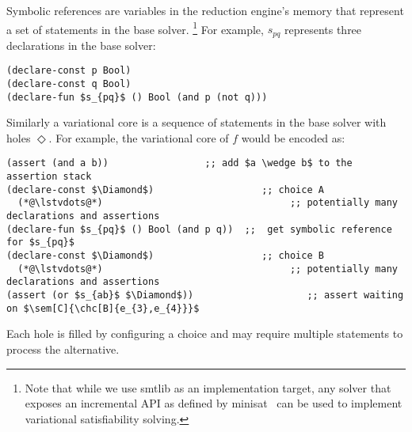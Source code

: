 Symbolic references are variables in the reduction engine's memory that
represent a set of statements in the base solver.%
%
\footnote{Note that while we use \acl{smtlib} as an implementation target, any
  solver that exposes an incremental API as defined by
  minisat~\cite{10.1007/978-3-319-09284-3_16} can be used to implement
  variational satisfiability solving.}
%
For example, $s_{pq}$ represents three declarations in the base solver:
%
\begin{lstlisting}[columns=flexible,keepspaces=true,language=SMTLIB]
(declare-const p Bool)
(declare-const q Bool)
(declare-fun $s_{pq}$ () Bool (and p (not q)))
\end{lstlisting}

Similarly a variational core is a sequence of statements in the base solver with
holes $\Diamond$. For example, the variational core of $f$ would be encoded as:
%
\begin{lstlisting}[columns=flexible,keepspaces=true,language=SMTLIB]
(assert (and a b))                 ;; add $a \wedge b$ to the assertion stack
(declare-const $\Diamond$)                   ;; choice A
  (*@\lstvdots@*)                                 ;; potentially many declarations and assertions
(declare-fun $s_{pq}$ () Bool (and p q))  ;;  get symbolic reference for $s_{pq}$
(declare-const $\Diamond$)                   ;; choice B
  (*@\lstvdots@*)                                 ;; potentially many declarations and assertions
(assert (or $s_{ab}$ $\Diamond$))                    ;; assert waiting on $\sem[C]{\chc[B]{e_{3},e_{4}}}$
\end{lstlisting}
%
Each hole is filled by configuring a choice and may require multiple
statements to process the alternative.

